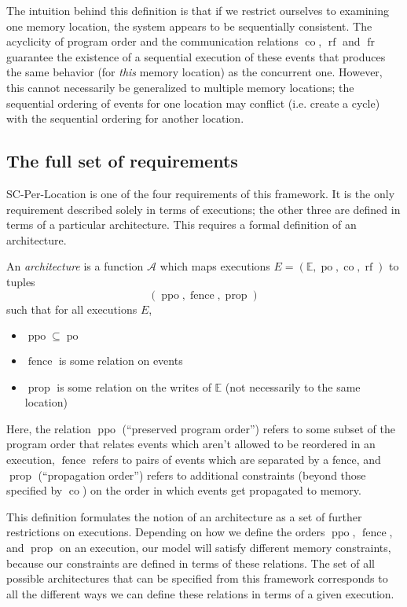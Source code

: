 \documentclass[]{eptcs}
\newenvironment{definition}[1][Definition.]{\begin{trivlist}
\item[\hskip \labelsep {\bfseries #1}]}{\end{trivlist}}
\DeclareMathOperator{\po}{po}
\DeclareMathOperator{\co}{co}
\DeclareMathOperator{\rf}{rf}
\DeclareMathOperator{\fr}{fr}
\DeclareMathOperator{\ppo}{ppo}
\DeclareMathOperator{\fence}{fence}
\DeclareMathOperator{\prop}{prop}
\begin{document}
The intuition behind this definition is that if we restrict ourselves to examining one memory location, the system appears to be sequentially consistent. The acyclicity of program order and the communication relations $\co$, $\rf$ and $\fr$ guarantee the existence of a sequential execution of these events that produces the same behavior (for \emph{this} memory location) as the concurrent one. However, this cannot necessarily be generalized to multiple memory locations; the sequential ordering of events for one location may conflict (i.e. create a cycle) with the sequential ordering for another location.

\subsection{The full set of requirements}

SC-Per-Location is one of the four requirements of this framework. It is the only requirement described solely in terms of executions; the other three are defined in terms of a particular architecture. This requires a formal definition of an architecture.

\begin{definition}
An \emph{architecture} is a function $\mathcal{A}$ which maps executions $E = (\mathbb{E}, \po, \co, \rf)$ to tuples 
\[
(\ppo, \fence, \prop)
\] 
such that for all executions $E$,
\begin{itemize}
  \item $\ppo \subseteq \po$
  \item $\fence$ is some relation on events
  \item $\prop$ is some relation on the writes of $\mathbb{E}$ (not necessarily to the same location)
\end{itemize}
\end{definition}
Here, the relation $\ppo$ (``preserved program order'') refers to some subset of the program order that relates events which aren't allowed to be reordered in an execution, $\fence$ refers to pairs of events which are separated by a fence, and $\prop$ (``propagation order'') refers to additional constraints (beyond those specified by $\co$) on the order in which events get propagated to memory.

This definition formulates the notion of an architecture as a set of further restrictions on executions. Depending on how we define the orders $\ppo$, $\fence$, and $\prop$ on an execution, our model will satisfy different memory constraints, because our constraints are defined in terms of these relations. The set of all possible architectures that can be specified from this framework corresponds to all the different ways we can define these relations in terms of a given execution.
\end{document}
